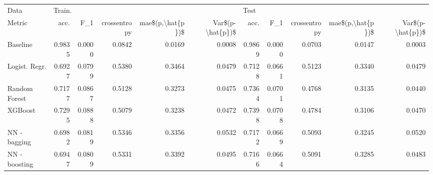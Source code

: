 \begin{tabular}{lrrrrrrrrrr}
\toprule
Data & \multicolumn{5}{l}{Train.} & \multicolumn{5}{l}{Test} \\
Metric &    acc. &     F\_1 & crossentropy & mae\$(p,\textbackslash hat\{p\})\$ & Var\$(p-\textbackslash hat\{p\})\$ &    acc. &     F\_1 & crossentropy & mae\$(p,\textbackslash hat\{p\})\$ & Var\$(p-\textbackslash hat\{p\})\$ \\
\midrule
Baseline      &  0.9835 &  0.0000 &       0.0842 &           0.0169 &           0.0008 &  0.9869 &  0.0000 &       0.0703 &           0.0147 &           0.0003 \\
Logist. Regr. &  0.6927 &  0.0799 &       0.5380 &           0.3464 &           0.0479 &  0.7128 &  0.0661 &       0.5123 &           0.3340 &           0.0479 \\
Random Forest &  0.7177 &  0.0867 &       0.5128 &           0.3273 &           0.0475 &  0.7364 &  0.0701 &       0.4768 &           0.3135 &           0.0440 \\
XGBoost       &  0.7295 &  0.0888 &       0.5079 &           0.3238 &           0.0472 &  0.7398 &  0.0708 &       0.4784 &           0.3106 &           0.0470 \\
NN - bagging  &  0.6982 &  0.0819 &       0.5346 &           0.3356 &           0.0532 &  0.7172 &  0.0669 &       0.5093 &           0.3245 &           0.0520 \\
NN - boosting &  0.6947 &  0.0809 &       0.5331 &           0.3392 &           0.0495 &  0.7166 &  0.0664 &       0.5091 &           0.3285 &           0.0483 \\
\bottomrule
\end{tabular}
